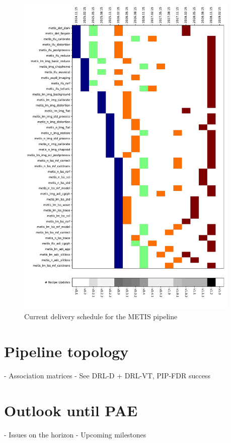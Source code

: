 \documentclass[a4paper]{spie}  %
\begin{document}
\begin{figure}
    \centering
    \includegraphics[width=0.95\textwidth]{SPIE_paper/figures/deliveries_recipes.pdf}
    \caption{Current delivery schedule for the METIS pipeline}
    \label{fig:del_schedule}
\end{figure}

\section{Pipeline topology}
\label{sec:pip}
- Association matrices
- See DRL-D + DRL-VT, PIP-FDR success




\section{Outlook until PAE}
\label{sec:outlook}
- Issues on the horizon
- Upcoming milestones


\appendix    %

\acknowledgments %


\end{document}
